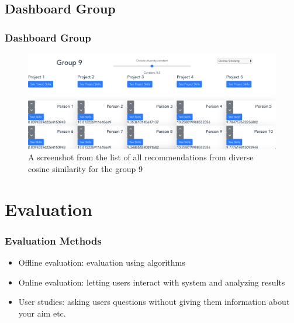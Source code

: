 \documentclass{beamer}
\begin{document}
\subsection{Dashboard Group} 
\begin{frame}
\frametitle{Dashboard Group}
\begin{figure}
\includegraphics[scale=0.22]{images/DashboardGroup} 
\caption{A screenshot from the list of all recommendations from diverse cosine similarity for the group 9}
\end{figure}
\end{frame}

\section{Evaluation} 
\begin{frame}
\frametitle{Evaluation Methods}
\begin{itemize}
	\item Offline evaluation: evaluation using algorithms
	\item Online evaluation: letting users interact with system and analyzing results
	\item User studies: asking users questions without giving them information about your aim etc.
\end{itemize} 
\end{frame}
\end{document}
